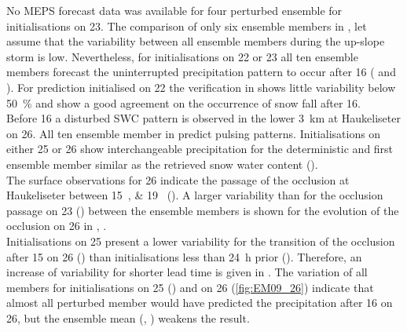 No MEPS forecast data was available for four perturbed ensemble for initialisations on \SI{23}{\dec}.
The comparison of only six ensemble members %
in , let assume that the variability between all ensemble members during the up-slope storm is low.%
Nevertheless, for initialisations on \num{22} or \SI{23}{\dec} all ten ensemble members forecast the uninterrupted precipitation pattern to occur after \SI{16}{\UTC} ( and ). 
For prediction initialised on \SI{22}{\dec} the verification in  shows little variability below \SI{50}{\percent} and show a good agreement on the occurrence of snow fall after \SI{16}{\UTC}. 
\\
Before \SI{16}{\UTC} a disturbed SWC pattern is observed in the lower \SI{3}{\km} at Haukeliseter on \SI{26}{\dec}. All ten ensemble member in  predict pulsing patterns. Initialisations on either \num{25} or \SI{26}{\dec} show interchangeable precipitation for the deterministic and first ensemble member similar as the retrieved snow water content (). 
\\
The surface observations for \SI{26}{\dec} indicate the passage of the occlusion at Haukeliseter between \SIlist{15;19}{\UTC} (). A larger variability than for the occlusion passage on \SI{23}{\dec} () between the ensemble members is shown for the evolution of the occlusion on \SI{26}{\dec} in , .  
\\
Initialisations on \SI{25}{\dec} present a lower variability for the transition of the occlusion after \SI{15}{\UTC} on \SI{26}{\dec}  () than initialisations less than \SI{24}{\hour} prior (). 
Therefore, an increase of variability for shorter lead time is given in . %
The variation of all members for initialisations on \SI{25}{\dec} () and on \SI{26}{\dec} (\ref{fig:EM09_26}) indicate that almost all perturbed member would have predicted the precipitation after \SI{16}{\UTC} on \SI{26}{\dec}, but the ensemble mean (, ) weakens the result. 
